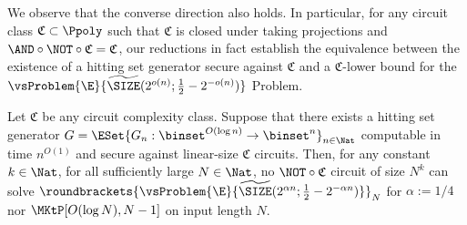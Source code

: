 \documentclass{toc}
\begin{document}
We observe that the converse direction also holds.
In particular, for any circuit class $\mathfrak{C} \subset \Ppoly$ such that $\mathfrak{C}$ is closed under taking projections and $\AND \circ \NOT \circ \mathfrak{C} = \mathfrak{C}$,
our reductions in fact establish the equivalence
between the existence of a hitting set generator secure against $\mathfrak{C}$
and a $\mathfrak{C}$-lower bound for the $\vsProblem{\E}{\widetilde{\SIZE}(2^{o(n)}; \frac{1}{2} - 2^{- o(n)})}$ Problem.
\begin{proposition}
  \label{prop_Converse}
  Let $\mathfrak{C}$ be any circuit complexity class.
  Suppose that
  there exists a hitting set generator $G = \ESet{ G_n : \binset^{O(\log n)} \to \binset^n }_{n \in \Nat} $ computable in time $n^{O(1)}$ and secure against linear-size $\mathfrak{C}$ circuits.
  Then,
  for any constant $k \in \Nat$,
  for all sufficiently large $N \in \Nat$,
  no $\NOT \circ \mathfrak{C}$ circuit of size $N^{k}$
  can solve $\roundbrackets{ \vsProblem{\E}{\widetilde{\SIZE}(2^{\alpha n}; \frac{1}{2} - 2^{- \alpha n})} }_N$
  for $\alpha := 1/4$
  nor $\MKtP[O(\log N), N - 1]$ on input length $N$.
\end{proposition}
\end{document}
